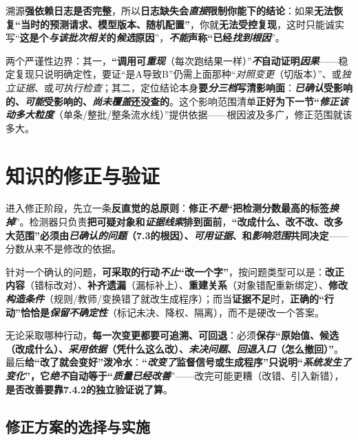 溯源\textbf{强依赖日志是否完整}，所以\textbf{日志缺失会\emph{直接}限制你能下的结论}：如果\textbf{无法恢复“当时的预测请求、模型版本、随机配置”}，你就\textbf{无法受控复现}，这时只能诚实写“\textbf{这是个\emph{与该批次相关}的\emph{候选}原因}”，\textbf{\emph{不能}声称“已经\emph{找到根因}}”。

两个严谨性边界：其一，\textbf{“调用可\emph{重现}}（每次跑结果一样）”\textbf{\emph{不}自动证明\emph{因果}}——稳定复现只说明确定性，要证“是A导致B”仍需上面那种“\emph{对照变更}（切版本）”、或\emph{独立证据}、或\emph{可执行检查}；其二，定位结论本身\textbf{要\emph{分三档}写清影响面}：\textbf{\emph{已确认}受影响的、\emph{可能}受影响的、\emph{尚未覆盖}还没查的}。这个影响范围清单\textbf{正好为下一节“\emph{修正该动多大粒度}}（单条/整批/整条流水线）”提供依据——根因波及多广，修正范围就该多大。

\section{知识的修正与验证}
\label{sec:knowledge-quality-assessment-correction-repair}

进入修正阶段，先立一条\textbf{反直觉的总原则}：\textbf{修正\emph{不是}“把检测分数最高的标签\emph{换掉}}”。检测器只负责\textbf{把可疑对象和\emph{证据线索}排到面前}，\textbf{“改成什么、改不改、改多大范围”必须由\emph{已确认的问题}（7.3的根因）、\emph{可用证据}、和\emph{影响范围}共同决定}——分数从来不是修改的依据。

针对一个确认的问题，\textbf{可采取的行动\emph{不止}“改一个字”}，按问题类型可以是：\textbf{改正内容}（错标改对）、\textbf{补齐遗漏}（漏标补上）、\textbf{重建关系}（对象错配重新绑定）、\textbf{修改\emph{构造条件}}（规则/教师/变换错了就改生成程序）；而当\textbf{证据不足}时，\textbf{正确的“行动”恰恰是\emph{保留不确定性}}（标记未决、降权、隔离），而不是硬改一个答案。

无论采取哪种行动，\textbf{每一次变更都要可追溯、可回退}：必须\textbf{保存“原始值、候选（改成什么）、\emph{采用依据}（凭什么这么改）、\emph{未决问题}、\emph{回退入口}（怎么撤回）”}。最后\textbf{给“改了就会变好”泼冷水}：\textbf{“\emph{改变了}监督信号或生成程序”只说明“\emph{系统发生了变化}”，它\emph{绝不}自动等于“\emph{质量已经改善}}”——改完可能更糟（改错、引入新错），\textbf{是否改善要靠7.4.2的独立验证说了算}。

\subsection{修正方案的选择与实施}
\label{sec:knowledge-quality-assessment-correction-repair-selection}

